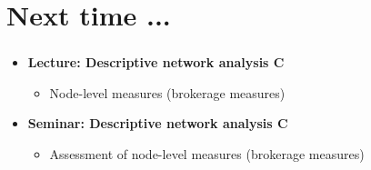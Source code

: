 \documentclass[8pt]{beamer}
\begin{document}


\section*{Next time ...}


\bgroup
{}
\begin{frame}[plain]{}
\begin{center}
\color{white}{\Huge\insertsection}
\end{center}
\end{frame}
\egroup


\begin{frame}
\frametitle{\insertsection}

\begin{itemize}

\item 	\textbf{Lecture: Descriptive network analysis C}
	\begin{itemize}
	\item Node-level measures (brokerage measures)
	\end{itemize}

\medskip
\medskip


\item 	\textbf{Seminar: Descriptive network analysis C}
	\begin{itemize}
	\item Assessment of node-level measures (brokerage measures)
	\end{itemize}
	

		
\end{itemize}

\end{frame}

\end{document}
